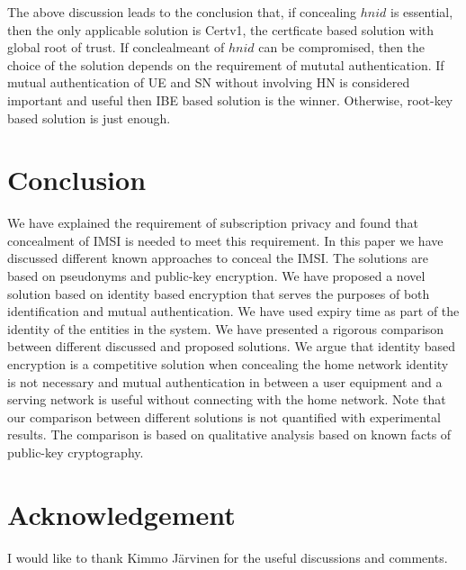 \documentclass[runningheads,a4paper]{llncs} %
\begin{document}
The above discussion leads to the conclusion that, if concealing $hnid$ is essential, then the only applicable solution is Certv1, the certficate based solution with global root of trust. If conclealmeant of $hnid$ can be compromised, then the choice  of the solution depends on the requirement of mututal authentication. If mutual authentication of UE and SN without involving HN is considered important and useful then IBE based solution is the winner. Otherwise, root-key based solution is just enough.


\section{Conclusion}
\label{sec:conclusion}
We have explained the requirement of subscription privacy and found that concealment of IMSI is needed to meet this requirement. In this paper we have discussed different known approaches to conceal the IMSI. The solutions  are based on pseudonyms and public-key encryption. We have proposed a novel solution based on identity based encryption that serves the purposes of both identification and mutual authentication. We have used expiry time as part of the identity of the entities in the system. We have presented a rigorous comparison between different discussed and proposed solutions. We argue that identity based encryption is a competitive solution when concealing the home network identity is not necessary and mutual authentication in between a user equipment and a serving network is useful without connecting with the home network. Note that our comparison between different solutions is not quantified with experimental results. The comparison is based on qualitative analysis based on known facts of public-key cryptography. 

\section{Acknowledgement}
\label{sec:acknowledgement}
I would like to thank Kimmo Järvinen for the useful discussions and comments.
\end{document}
